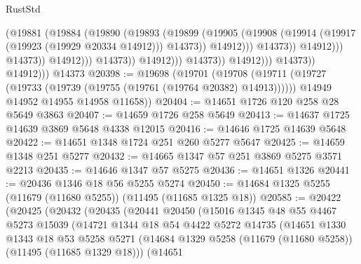 \begin{lexlean}{RustStd}
\begin{coremodule}
                                                (@19881
                                                  (@19884
                                                    (@19890
                                                      (@19893
                                                        (@19899
                                                          (@19905
                                                            (@19908
                                                              (@19914
                                                                (@19917
                                                                  (@19923 (@19929 @20334 @14912)))
                                                                @14373))
                                                            @14912)))
                                                      @14373))
                                                  @14912)))
                                            @14373))
                                        @14912)))
                                  @14373))
                              @14912)))
                        @14373))
                    @14912)))
              @14373))
          @14912)))
    @14373
@20398 := @19698
    (@19701
      (@19708
        (@19711 (@19727 (@19733 (@19739 (@19755 (@19761 (@19764 @20382) @14913))))))
        @14949
        @14952
        @14955
        @14958
        @11658))
@20404 := @14651 @1726 @120 @258 @28 @5649 @3863
@20407 := @14659 @1726 @258 @5649
@20413 := @14637 @1725 @14639 @3869 @5648 @4338 @12015
@20416 := @14646 @1725 @14639 @5648
@20422 := @14651 @1348 @1724 @251 @260 @5277 @5647
@20425 := @14659 @1348 @251 @5277
@20432 := @14665 @1347 @57 @251 @3869 @5275 @3571 @2213
@20435 := @14646 @1347 @57 @5275
@20436 := @14651 @1326
@20441 := @20436 @1346 @18 @56 @5255 @5274
@20450 := @14684 @1325 @5255 (@11679 (@11680 @5255)) (@11495 (@11685 @1325 @18))
@20585 := @20422
    (@20425
      (@20432
        (@20435
          (@20441
            @20450
            (@15016
              @1345
              @48
              @55
              @4467
              @5273
              @15039
              (@14721
                @1344
                @18
                @54
                @4422
                @5272
                @14735
                (@14651
                  @1330
                  @1343
                  @18
                  @53
                  @5258
                  @5271
                  (@14684 @1329 @5258 (@11679 (@11680 @5258)) (@11495 (@11685 @1329 @18)))
                  (@14651

\end{coremodule}
\end{lexlean}
